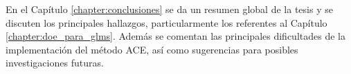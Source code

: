 En el Capítulo \ref{chapter:conclusiones} se da un resumen global de la tesis y se discuten los principales hallazgos, particularmente los referentes al Capítulo \ref{chapter:doe_para_glms}. Además se comentan las principales dificultades de la implementación del método ACE, así como sugerencias para posibles investigaciones futuras. \\

\newpage

